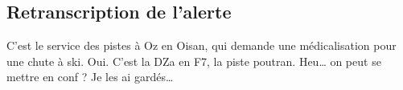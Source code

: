 \subsection{Retranscription de l'alerte}
\begin{dialogue}
  \Req {} C'est le service des pistes à Oz en Oisan, qui demande une
  médicalisation pour une chute à ski.
  \Sec Oui.
  \Req C'est la \gls{DZa} en
  F7, la piste poutran. Heu… on peut se mettre en conf ? Je les ai
  gardés… 
\end{dialogue}

